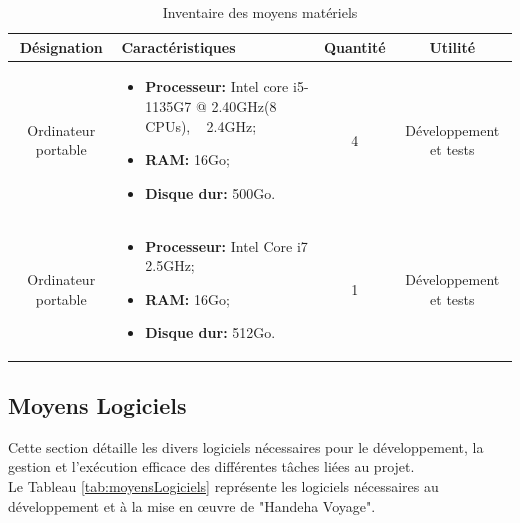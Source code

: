\documentclass[12pt]{report}
\begin{document}
				\begin{longtable}{|c|p{5cm}|c|c|}
				\caption{Inventaire des moyens matériels}
				\label{tab:moyensMateriels}\\
			      \hline
				     \textbf{Désignation} & \textbf{Caractéristiques} & \textbf{Quantité} & \textbf{Utilité}\\
			      \hline
				\endfirsthead
				\endhead
				Ordinateur portable &
				\begin{itemize}
					\item \textbf{Processeur:} Intel core i5-1135G7 @ 2.40GHz(8 CPUs), ~ 2.4GHz;
					\item \textbf{RAM:} 16Go;
					\item \textbf{Disque dur:} 500Go.
				\end{itemize}
				& 4 & Développement et tests\\
				\hline
					Ordinateur portable &
					\begin{itemize}
						\item \textbf{Processeur:} Intel Core i7 2.5GHz;
						\item \textbf{RAM:} 16Go;
						\item \textbf{Disque dur:} 512Go.
					\end{itemize}
					& 1 & Développement et tests\\
				\hline
				\end{longtable}
				\FloatBarrier

				\subsection{Moyens Logiciels}

				\hspace{15pt} Cette section détaille les divers logiciels nécessaires pour le développement, la gestion et l'exécution efficace des différentes tâches liées au projet.\\

				Le Tableau \ref{tab:moyensLogiciels} représente les logiciels nécessaires au développement et à la mise en œuvre de "Handeha Voyage".
\end{document}
